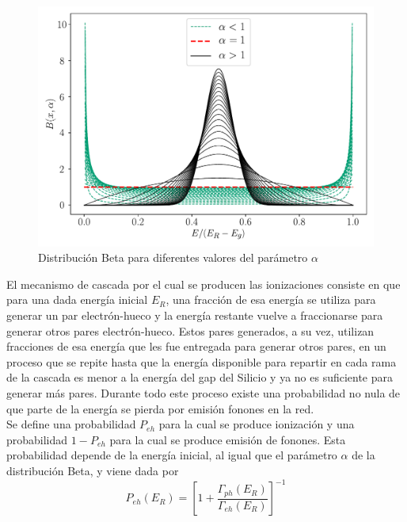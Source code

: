 \begin{figure}%
    \centering
        \includegraphics[scale=.7]{Figs/BetaDistFig.pdf}
    \caption{\footnotesize{Distribución Beta para diferentes valores del parámetro $\alpha$}}
    \label{fig:BetaDist}
\end{figure}
\indent El mecanismo de cascada por el cual se producen las ionizaciones consiste en que para una dada energía inicial $E_{R}$, una fracción de esa energía se utiliza para generar un par electrón-hueco y la energía restante vuelve a fraccionarse para generar otros pares electrón-hueco. Estos pares generados, a su vez, utilizan fracciones de esa energía que les fue entregada para generar otros pares, en un proceso que se repite hasta que la energía disponible para repartir en cada rama de la cascada es menor a la energía del gap del Silicio y ya no es suficiente para generar más pares. Durante todo este proceso existe una probabilidad no nula de que parte de la energía se pierda por emisión fonones en la red.\\
\indent Se define una probabilidad $P_{eh}$ para la cual se produce ionización y una probabilidad $1 - P_{eh}$ para la cual se produce emisión de fonones. Esta probabilidad depende de la energía inicial, al igual que el parámetro $\alpha$ de la distribución Beta, y viene dada por
\begin{equation}
    P_{eh}(E_{R}) = 
    \left[
        1 + \frac{\Gamma_{ph}(E_{R})}{\Gamma_{eh}(E_{R})}
    \right]^{-1}
        \label{ec:ProbabilidadIonizacion}
\end{equation}
